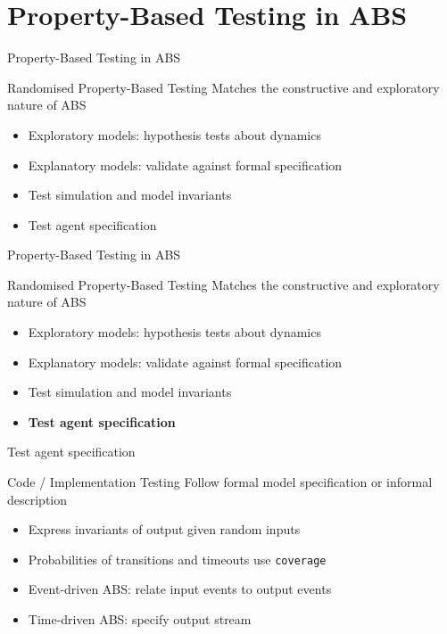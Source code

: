 \documentclass{beamer} %
\begin{document}
\section{Property-Based Testing in ABS}
\begin{frame}{Property-Based Testing in ABS}
\begin{block}{Randomised Property-Based Testing}
Matches the constructive and exploratory nature of ABS
\end{block}

  \begin{itemize}
    \item Exploratory models: hypothesis tests about dynamics
    \item Explanatory models: validate against formal specification
    \item Test simulation and model invariants
    \item Test agent specification
  \end{itemize}
\end{frame}

\begin{frame}{Property-Based Testing in ABS}
\begin{block}{Randomised Property-Based Testing}
Matches the constructive and exploratory nature of ABS
\end{block}

  \begin{itemize}
    \item Exploratory models: hypothesis tests about dynamics
    \item Explanatory models: validate against formal specification
    \item Test simulation and model invariants
    \item \textbf{Test agent specification}
  \end{itemize}
\end{frame}

\begin{frame}{Test agent specification}
\begin{block}{Code / Implementation Testing}
Follow formal model specification or informal description
\end{block}

\begin{block}{}
  \begin{itemize}
  	\item Express invariants of output given random inputs
  	\item Probabilities of transitions and timeouts use \texttt{coverage}
    \item Event-driven ABS: relate input events to output events 
    \item Time-driven ABS: specify output stream
  \end{itemize}
\end{block}
\end{frame}
\end{document}
